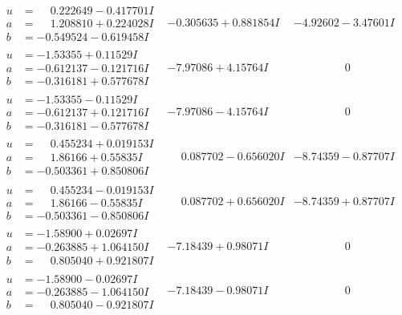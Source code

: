 \documentclass[1p]{elsarticle_modified}
\theoremstyle{definition}
\begin{document}
$$\begin{array}{c|c|c}
\begin{aligned}
u &= \phantom{-}0.222649 - 0.417701 I \\
a &= \phantom{-}1.208810 + 0.224028 I \\
b &= -0.549524 - 0.619458 I\end{aligned}
 & -0.305635 + 0.881854 I & -4.92602 - 3.47601 I \\ \hline\begin{aligned}
u &= -1.53355 + 0.11529 I \\
a &= -0.612137 - 0.121716 I \\
b &= -0.316181 + 0.577678 I\end{aligned}
 & -7.97086 + 4.15764 I & \phantom{-0.000000 } 0 \\ \hline\begin{aligned}
u &= -1.53355 - 0.11529 I \\
a &= -0.612137 + 0.121716 I \\
b &= -0.316181 - 0.577678 I\end{aligned}
 & -7.97086 - 4.15764 I & \phantom{-0.000000 } 0 \\ \hline\begin{aligned}
u &= \phantom{-}0.455234 + 0.019153 I \\
a &= \phantom{-}1.86166 + 0.55835 I \\
b &= -0.503361 + 0.850806 I\end{aligned}
 & \phantom{-}0.087702 - 0.656020 I & -8.74359 - 0.87707 I \\ \hline\begin{aligned}
u &= \phantom{-}0.455234 - 0.019153 I \\
a &= \phantom{-}1.86166 - 0.55835 I \\
b &= -0.503361 - 0.850806 I\end{aligned}
 & \phantom{-}0.087702 + 0.656020 I & -8.74359 + 0.87707 I \\ \hline\begin{aligned}
u &= -1.58900 + 0.02697 I \\
a &= -0.263885 + 1.064150 I \\
b &= \phantom{-}0.805040 + 0.921807 I\end{aligned}
 & -7.18439 + 0.98071 I & \phantom{-0.000000 } 0 \\ \hline\begin{aligned}
u &= -1.58900 - 0.02697 I \\
a &= -0.263885 - 1.064150 I \\
b &= \phantom{-}0.805040 - 0.921807 I\end{aligned}
 & -7.18439 - 0.98071 I & \phantom{-0.000000 } 0 \\ \hline\begin{aligned}

\end{aligned}
\end{array}$$
\end{document}
